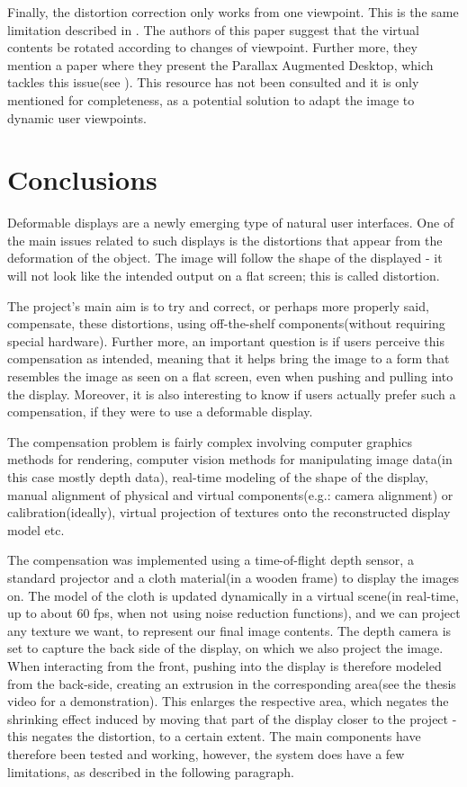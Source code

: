 \documentclass[]{article}
\begin{document}
Finally, the distortion correction only works from one viewpoint. This is the same limitation described in \cite{watanabe08}. The authors of this paper suggest that the virtual contents be rotated according to changes of viewpoint. Further more, they mention a paper where they present the Parallax Augmented Desktop, which tackles this issue(see \cite{reynolds08}). This resource has not been consulted and it is only mentioned for completeness, as a potential solution to  adapt the image to dynamic user viewpoints.

\clearpage
\section{Conclusions}

Deformable displays are a newly emerging type of natural user interfaces. One of the main issues related to such displays is the distortions that appear from the deformation of the object. The image will follow the shape of the displayed - it will not look like the intended output on a flat screen; this is called distortion. 

The project's main aim is to try and correct, or perhaps more properly said, compensate, these distortions, using off-the-shelf components(without requiring special hardware). Further more, an important question is if users perceive this compensation as intended, meaning that it helps bring the image to a form that resembles the image as seen on a flat screen, even when pushing and pulling into the display. Moreover, it is also interesting to know if users actually prefer such a compensation, if they were to use a deformable display.

The compensation problem is fairly complex involving computer graphics methods for rendering, computer vision methods for manipulating image data(in this case mostly depth data), real-time modeling of the shape of the display, manual alignment of physical and virtual components(e.g.: camera alignment) or calibration(ideally), virtual projection of textures onto the reconstructed display model etc. 

The compensation was implemented using a time-of-flight depth sensor, a standard projector and a cloth material(in a wooden frame) to display the images on. The model of the cloth is updated dynamically in a virtual scene(in real-time, up to about 60 fps, when not using noise reduction functions), and we can project any texture we want, to represent our final image contents. The depth camera is set to capture the back side of the display, on which we also project the image. When interacting from the front, pushing into the display is therefore modeled from the back-side, creating an extrusion in the corresponding area(see the thesis video for a demonstration). This enlarges the respective area, which negates the shrinking effect induced by moving that part of the display closer to the project - this negates the distortion, to a certain extent. The main components have therefore been tested and working, however, the system does have a few limitations, as described in the following paragraph.
\end{document}
